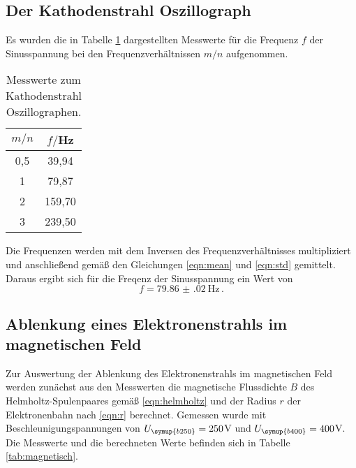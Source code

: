 \subsection{Der Kathodenstrahl Oszillograph}
\label{subsec:kathodenstrahloszillograph}

Es wurden die in Tabelle \ref{tab:kat_os} dargestellten Messwerte für die Frequenz
$f$ der Sinusspannung bei den Frequenzverhältnissen $m/n$ aufgenommen.

\begin{table}[h!]
	\begin{center}
    \caption{Messwerte zum Kathodenstrahl Oszillographen.}
    \label{tab:kat_os}
		\begin{tabular}{cc}
		\toprule
			{$m/n$} & {$f/$Hz}\\
			\midrule
      0,5   &   39,94 \\
      1   &   79,87 \\
      2   &   159,70  \\
      3   &   239,50\\
		\bottomrule
		\end{tabular}
	\end{center}
\end{table}
Die Frequenzen werden mit dem Inversen des Frequenzverhältnisses multipliziert und
anschließend gemäß  den Gleichungen \eqref{eqn:mean} und \eqref{eqn:std} gemittelt.
Daraus ergibt sich für die Freqenz der Sinusspannung ein Wert von
\begin{equation*}
  f=\SI{79.86(02)}{\hertz} \,.
\end{equation*}


\subsection{Ablenkung eines Elektronenstrahls im magnetischen Feld}
\label{subsec:bfeld}

Zur Auswertung der Ablenkung des Elektronenstrahls im magnetischen Feld werden
zunächst aus den Messwerten die magnetische Flussdichte $B$ des Helmholtz-Spulenpaares
gemäß \eqref{eqn:helmholtz} und der Radius $r$ der Elektronenbahn nach \eqref{eqn:r} berechnet.
Gemessen wurde mit Beschleunigungspannungen von $U_{\symup{b250}}=250$V und
$U_{\symup{b400}}=400$V. Die Messwerte und
die berechneten Werte befinden sich in Tabelle \ref{tab:magnetisch}.

